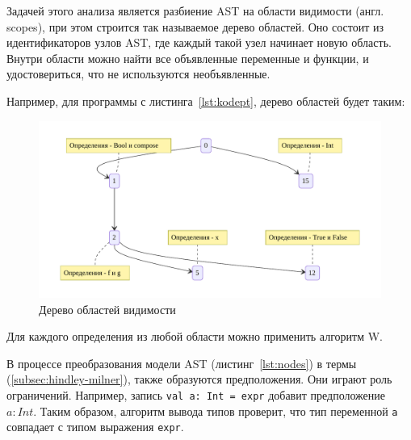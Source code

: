 Задачей этого анализа является разбиение AST на области видимости (англ. scopes), при этом строится так называемое дерево областей.
Оно состоит из идентификаторов узлов AST, где каждый такой узел начинает новую область.
Внутри области можно найти все объявленные переменные и функции, и удостовериться, что не используются необъявленные.

Например, для программы с листинга~\ref{lst:kodept}, дерево областей будет таким:

\begin{figure}
    \centering
    \includegraphics[width=\textwidth]{figures/scopes}
    \caption{Дерево областей видимости}
    \label{fig:scopes}
\end{figure}

Для каждого определения из любой области можно применить алгоритм W.

В процессе преобразования модели AST (листинг~\ref{lst:nodes}) в термы (\ref{subsec:hindley-milner}), также образуются предположения.
Они играют роль ограничений.
Например, запись \lstinline{val a: Int = expr} добавит предположение $a: Int$.
Таким образом, алгоритм вывода типов проверит, что тип переменной \lstinline{a} совпадает с типом выражения \lstinline{expr}.

